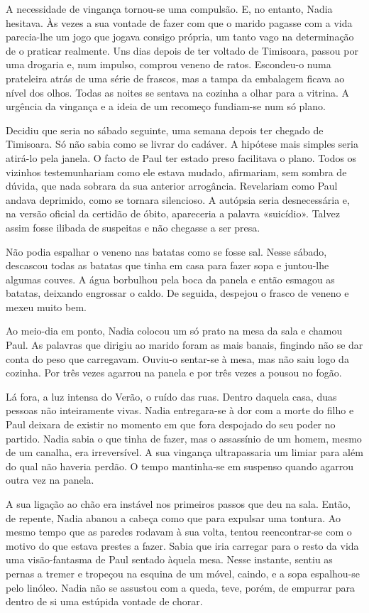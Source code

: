 A necessidade de vingança tornou-se uma compulsão. E, no entanto, Nadia
hesitava. Às vezes a sua vontade de fazer com que o marido pagasse com a
vida parecia-lhe um jogo que jogava consigo própria, um tanto vago na
determinação de o praticar realmente. Uns dias depois de ter voltado
de Timisoara, passou por uma drogaria e, num impulso, comprou veneno de
ratos. Escondeu-o numa prateleira atrás de uma série de frascos, mas a
tampa da embalagem ficava ao nível dos olhos. Todas as noites se
sentava na cozinha a olhar para a vitrina. A urgência da vingança e a
ideia de um recomeço fundiam-se num só plano.

Decidiu que seria no sábado seguinte, uma semana depois ter chegado de
Timisoara. Só não sabia como se livrar do cadáver. A hipótese mais
simples seria atirá-lo pela janela. O facto de Paul ter estado preso
facilitava o plano. Todos os vizinhos testemunhariam como ele estava
mudado, afirmariam, sem sombra de dúvida, que nada sobrara da sua
anterior arrogância. Revelariam como Paul andava deprimido, como se
tornara silencioso. A autópsia seria desnecessária e, na versão oficial
da certidão de óbito, apareceria a palavra «suicídio». Talvez assim
fosse ilibada de suspeitas e não chegasse a ser presa.

Não podia espalhar o veneno nas batatas como se fosse sal. Nesse sábado,
descascou todas as batatas que tinha em casa para fazer sopa e
juntou-lhe algumas couves. A água borbulhou pela boca da panela e então
esmagou as batatas, deixando engrossar o caldo. De seguida, despejou o
frasco de veneno e mexeu muito bem.

Ao meio-dia em ponto, Nadia colocou um só prato na mesa da sala e chamou
Paul. As palavras que dirigiu ao
marido foram as mais banais, fingindo não se dar conta do peso que
carregavam. Ouviu-o sentar-se à mesa, mas não saiu logo da cozinha. Por
três vezes agarrou na panela e por três vezes a pousou no fogão.

Lá fora, a luz intensa do Verão, o ruído das ruas. Dentro daquela casa,
duas pessoas não inteiramente vivas. Nadia entregara-se à dor com a
morte do filho e Paul deixara de existir no momento em que fora
despojado do seu poder no partido. Nadia sabia o que tinha de fazer, mas
o assassínio de um homem, mesmo de um canalha, era irreversível. A
sua vingança ultrapassaria um limiar para além do qual não haveria
perdão. O tempo mantinha-se em suspenso quando agarrou outra vez na
panela.

A sua ligação ao chão era instável nos primeiros passos que deu na sala.
Então, de repente, Nadia abanou a cabeça como que para expulsar uma
tontura. Ao mesmo tempo que as paredes rodavam à sua volta, tentou
reencontrar-se com o motivo do que estava prestes a fazer. Sabia que
iria carregar para o resto da vida uma visão-fantasma de Paul sentado
àquela mesa. Nesse instante, sentiu as pernas a tremer e tropeçou na
esquina de um móvel, caindo, e a sopa espalhou-se pelo linóleo. Nadia
não se assustou com a queda, teve, porém, de empurrar para dentro de si
uma estúpida vontade de chorar.

